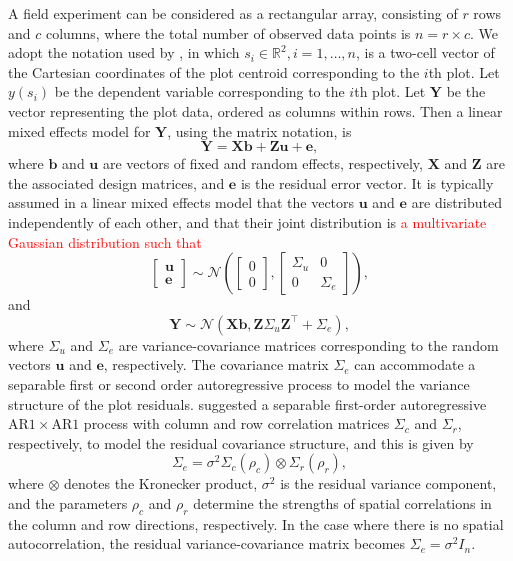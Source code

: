 \documentclass[a4paper]{article}   	%
\newcommand{\N}{\mathcal{N}}
\newcommand{\AR}{\mathrm{AR}1}
\begin{document}
	A field experiment can be considered as a rectangular array, consisting of $r$ rows and $c$ columns, where the total number of observed data points is $n= r\times c$. We adopt the notation used by \textcite{Zimmerman1991Randoma}, in which $s_i\in \mathbb{R}^2, i=1,\ldots,n$, is a two-cell vector of the Cartesian coordinates of the plot centroid corresponding to the $i$th plot. Let $y(s_i)$ be the dependent variable corresponding to the $i$th plot. Let $\bm{Y}$ be the vector representing the plot data, ordered as columns within rows. Then a linear mixed effects model for $\bm{Y}$, using the matrix notation, is 
	\begin{equation}\label{eq:modelmatrix}
		\bm{Y} = \bm{X}\bm{b}+\bm{Z}\bm{u}+\bm{e},
	\end{equation}
	where $\bm{b}$ and $\bm{u}$ are vectors of fixed and random effects, respectively, $\bm{X}$ and $\bm{Z}$ are the associated design matrices, and $\bm{e}$ is the residual error vector. It is typically assumed in a linear mixed effects model that the vectors $\bm{u}$ and $\bm{e}$ are distributed independently of each other, and that their joint distribution is \textcolor{red}{a multivariate Gaussian distribution such that}
	\begin{equation}\label{eq:covariance}
		\begin{bmatrix}
			\bm{u} \\ \bm{e}
		\end{bmatrix} \sim \N\left( \begin{bmatrix}
			0\\0 \end{bmatrix}, \begin{bmatrix}
			\Sigma_u & 0 \\ 0 & \Sigma_e
		\end{bmatrix}\right),
	\end{equation}
	and 
	\begin{equation}\label{eq:distributionY}
		\bm{Y} \sim \N(\bm{X}\bm{b},\bm{Z}\Sigma_u\bm{Z}^\top+\Sigma_e),
	\end{equation}
	where $\Sigma_u$ and $\Sigma_e$ are variance-covariance matrices corresponding to the random vectors $\bm{u}$ and $\bm{e}$, respectively. The covariance matrix $\Sigma_e$ can accommodate a separable first or second order autoregressive process to model the variance structure of the plot residuals. \textcite{Gilmour1997Accounting} suggested a separable first-order autoregressive $\AR\times \AR$ process with column and row correlation matrices $\Sigma_c$ and $\Sigma_r$, respectively, to model the residual covariance structure, and this is given by 
	\begin{equation}\label{eq:ar1}
		\Sigma_e =\sigma^2\Sigma_c(\rho_c) \otimes \Sigma_r(\rho_r),
	\end{equation}
	where $\otimes$ denotes the Kronecker product, $\sigma^2$ is the residual variance component, and the parameters $\rho_c$ and $\rho_r$ determine the strengths of spatial correlations in the column and row directions, respectively. In the case where there is no spatial autocorrelation, the residual variance-covariance matrix becomes $\Sigma_e=\sigma^2 I_n$. 
	
\end{document}
